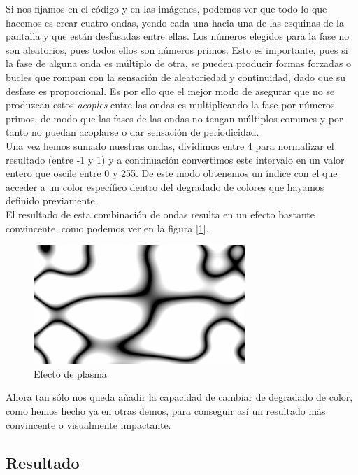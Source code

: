 Si nos fijamos en el código y en las imágenes, podemos ver que todo lo que hacemos es crear cuatro ondas, yendo cada una hacia una de las esquinas de la pantalla y que están desfasadas entre ellas. Los números elegidos para la fase no son aleatorios, pues todos ellos son números primos. Esto es importante, pues si la fase de alguna onda es múltiplo de otra, se pueden producir formas forzadas o bucles que rompan con la sensación de aleatoriedad y continuidad, dado que su desfase es proporcional. Es por ello que el mejor modo de asegurar que no se produzcan estos \emph{acoples} entre las ondas es multiplicando la fase por números primos, de modo que las fases de las ondas no tengan múltiplos comunes y por tanto no puedan acoplarse o dar sensación de periodicidad.\\  

Una vez hemos sumado nuestras ondas, dividimos entre 4 para normalizar el resultado (entre -1 y 1) y a continuación convertimos este intervalo en un valor entero que oscile entre 0 y 255. De este modo obtenemos un índice con el que acceder a un color específico dentro del degradado de colores que hayamos definido previamente.\\

El resultado de esta combinación de ondas resulta en un efecto bastante convincente, como podemos ver en la figura [\ref{fig:whiteplasma}].\\

\begin{figure}[h]
	\centering
	\includegraphics[width=8cm]{archivos/whiteplasma}
	\caption{Efecto de plasma}
	\label{fig:whiteplasma}
\end{figure}

Ahora tan sólo nos queda añadir la capacidad de cambiar de degradado de color, como hemos hecho ya en otras demos, para conseguir así un resultado más convincente o visualmente impactante.

\subsection{Resultado}

